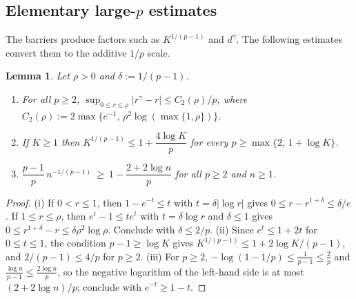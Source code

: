 \documentclass[11pt]{article}
\newcommand{\abs}[1]{\lvert #1\rvert}
\newtheorem{lemma}[theorem]{Lemma}
\theoremstyle{definition}
\theoremstyle{remark}
\begin{document}
\subsection{Elementary large-\texorpdfstring{$p$}{p} estimates}
The barriers produce factors such as $K^{1/(p-1)}$ and $d^{\gamma}$. The
following estimates convert them to the additive $1/p$ scale.
\begin{lemma}\label{lem:elementary}
Let $\rho>0$ and $\delta:=1/(p-1)$.
\begin{enumerate}
\item[(i)] For all $p\ge2$,
$\sup_{0\le r\le\rho}\abs{r^{\gamma}-r}\le C_2(\rho)/p$, where
$C_2(\rho):=2\max\{e^{-1},\,\rho^2\log(\max\{1,\rho\})\}$.
\item[(ii)] If $K\ge1$ then $K^{1/(p-1)}\le1+\dfrac{4\log K}{p}$ for every
$p\ge\max\{2,\,1+\log K\}$.
\item[(iii)] $\dfrac{p-1}{p}\,n^{-1/(p-1)}\ \ge\ 1-\dfrac{2+2\log n}{p}$ for
all $p\ge2$ and $n\ge1$.
\end{enumerate}
\end{lemma}
\begin{proof}
(i) If $0<r\le1$, then $1-e^{-t}\le t$ with $t=\delta\abs{\log r}$ gives
$0\le r-r^{1+\delta}\le\delta/e$. If $1\le r\le\rho$, then $e^t-1\le te^t$
with $t=\delta\log r$ and $\delta\le1$ gives
$0\le r^{1+\delta}-r\le\delta\rho^2\log\rho$. Conclude with $\delta\le2/p$.
(ii) Since $e^t\le1+2t$ for $0\le t\le1$, the condition $p-1\ge\log K$ gives
$K^{1/(p-1)}\le1+2\log K/(p-1)$, and $2/(p-1)\le4/p$ for $p\ge2$.
(iii) For $p\ge2$, $-\log(1-1/p)\le\frac1{p-1}\le\frac2p$ and
$\frac{\log n}{p-1}\le\frac{2\log n}{p}$, so the negative logarithm of the
left-hand side is at most $(2+2\log n)/p$; conclude with $e^{-t}\ge1-t$.
\end{proof}

\end{document}
